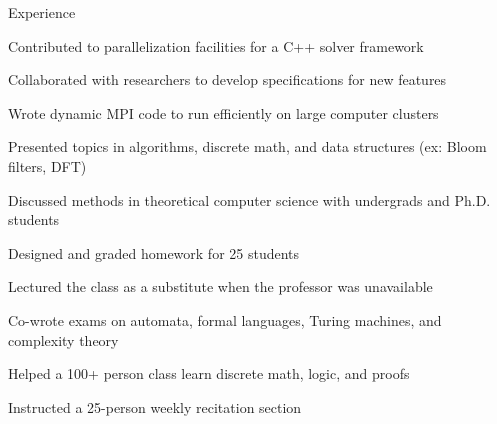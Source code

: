 \documentclass{cv}
\begin{document}

\begin{cvsection}{Experience}
  {
    \item Contributed to parallelization facilities for a C++ solver framework
    \item Collaborated with researchers to develop specifications for new features
    \item Wrote dynamic MPI code to run efficiently on large computer clusters
  }
  {
    \item Presented topics in algorithms, discrete math, and data structures (ex: Bloom filters, DFT)
    \item Discussed methods in theoretical computer science with undergrads and Ph.D. students
  }
  {
    \item Designed and graded homework for 25 students
    \item Lectured the class as a substitute when the professor was unavailable
    \item Co-wrote exams on automata, formal languages, Turing machines, and complexity theory
  }
  {
    \item Helped a 100+ person class learn discrete math, logic, and proofs
    \item Instructed a 25-person weekly recitation section
  }
\end{cvsection}
\end{document}
